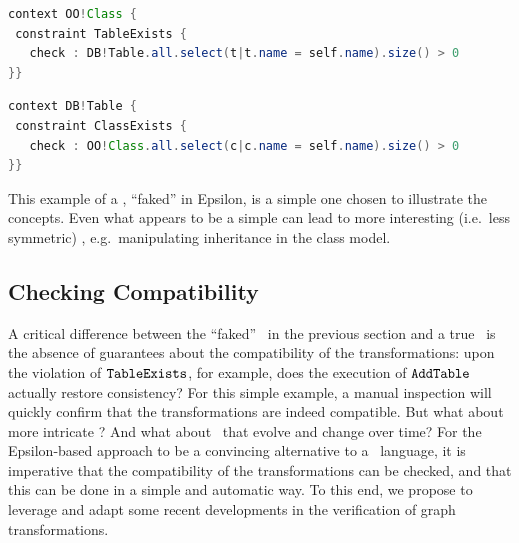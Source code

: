 		\begin{lstlisting}[language=java]
context OO!Class {
 constraint TableExists {
   check : DB!Table.all.select(t|t.name = self.name).size() > 0
}}	
		 \end{lstlisting}
		\hspace{7pt}
		\begin{lstlisting}[language=java]
context DB!Table {
 constraint ClassExists {
   check : OO!Class.all.select(c|c.name = self.name).size() > 0
}}
		\end{lstlisting}

This example of a \BX, ``faked'' in Epsilon, is a simple one chosen to illustrate the concepts. Even what appears to be a simple \BX can lead to more interesting (i.e.\ less symmetric) \BX, e.g.\ manipulating inheritance in the class model.

\subsection{Checking Compatibility}
A critical difference between the ``faked'' \BX\ in the previous section and a true \BX\ is the absence of guarantees about the compatibility of the transformations: upon the violation of $\tt TableExists$, for example, does the execution of $\tt AddTable$ actually restore consistency? For this simple example, a manual inspection will quickly confirm that the transformations are indeed compatible. But what about more intricate \BX? And what about \BX\ that evolve and change over time? For the Epsilon-based approach to be a convincing alternative to a \BX\ language, it is imperative that the compatibility of the transformations can be checked, and that this can be done in a simple and automatic way. To this end, we propose to leverage and adapt some recent developments in the verification of graph transformations.
	
